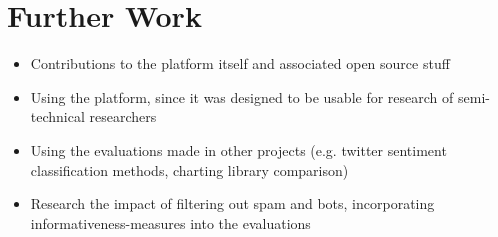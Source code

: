 \chapter{Further Work}
\label{ch:furtherWork}

\begin{itemize}
    \item
    Contributions to the platform itself and associated open source stuff
    \item
    Using the platform, since it was designed to be usable for research of semi-technical researchers
    \item
    Using the evaluations made in other projects (e.g. twitter sentiment classification methods, charting library comparison)
    \item
    Research the impact of filtering out spam and bots, incorporating informativeness-measures into the evaluations

\end{itemize}